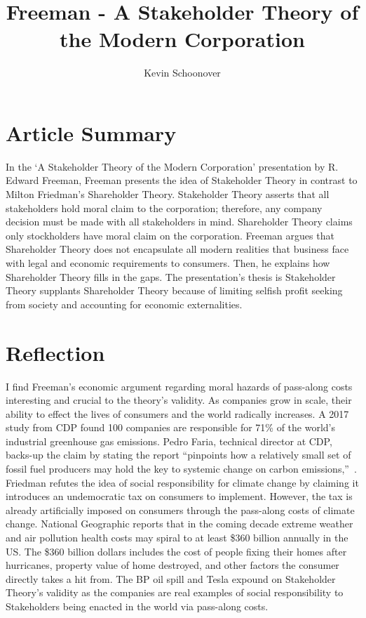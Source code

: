 \documentclass[12pt]{article}
\begin{document}
\title{Freeman - A Stakeholder Theory of the Modern Corporation}
\author{Kevin Schoonover}

\maketitle

\section{Article Summary}
In the `A Stakeholder Theory of the Modern Corporation' presentation by R.
Edward Freeman, Freeman presents the idea of Stakeholder Theory in contrast to
Milton Friedman's Shareholder Theory. Stakeholder Theory asserts that all
stakeholders hold moral claim to the corporation; therefore, any company
decision must be made with all stakeholders in mind. Shareholder Theory claims
only stockholders have moral claim on the corporation. Freeman argues that
Shareholder Theory does not encapsulate all modern realities that business face
with legal and economic requirements to consumers. Then, he explains how
Shareholder Theory fills in the gaps. The presentation's thesis is Stakeholder
Theory supplants Shareholder Theory because of limiting selfish profit seeking
from society and accounting for economic externalities.

\section{Reflection}

I find Freeman's economic argument regarding moral hazards of pass-along costs
interesting and crucial to the theory's validity. As companies grow in scale,
their ability to effect the lives of consumers and the world radically
increases. A 2017 study from CDP found 100 companies are responsible for 71\% of
the world's industrial greenhouse gas emissions. Pedro Faria, technical director
at CDP, backs-up the claim by stating the report “pinpoints how a relatively
small set of fossil fuel producers may hold the key to systemic change on carbon
emissions,”~\cite{cdp_report}. Friedman refutes the idea of social
responsibility for climate change by claiming it introduces an undemocratic tax
on consumers to implement. However, the tax is already artificially imposed on
consumers through the pass-along costs of climate change. National Geographic
reports that in the coming decade extreme weather and air pollution health costs
may spiral to at least \$360 billion annually in the US\cite{netgeo}. The \$360
billion dollars includes the cost of people fixing their homes after hurricanes,
property value of home destroyed, and other factors the consumer directly takes
a hit from. The BP oil spill and Tesla expound on Stakeholder Theory's validity
as the companies are real examples of social responsibility to Stakeholders
being enacted in the world via pass-along costs.
\end{document}
